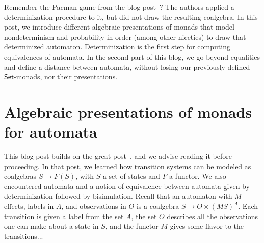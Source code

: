 \documentclass{article}
\newcommand{\cat}[1]{\mathsf{#1}}
\newcommand{\C}{\mathcal C}
\begin{document}




Remember the Pacman game from the blog post~? The authors applied a determinization procedure to it, but did not draw the resulting coalgebra. In this post, we introduce different algebraic presentations of monads that model nondeterminism and probability in order (among other niceties) to draw that determinized automaton. Determinization is the first step for computing equivalences of automata. In the second part of this blog, we go beyond equalities and define a distance between automata, without losing our previously defined
$\cat{Set}$-monads, nor their presentations.

\section{Algebraic presentations of monads for automata }

This blog post builds on the great post~, and we advise reading it before proceeding. In that post, we learned how transition systems can be modeled as coalgebras $S \to F(S)$, with $S$ a set of states and $F$ a functor. We also encountered automata and a notion of equivalence between automata given by determinization followed by bisimulation. Recall that an automaton with $M$-effects, labels in $A$, and observations in $O$ is a coalgebra $S \to O \times (MS)^A$. Each transition is given a label from the set $A$, the set $O$ describes all the observations one can make about a state in $S$, and the functor $M$ gives some flavor to the transitions...
\end{document}
